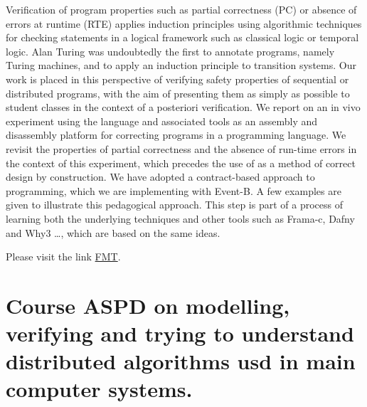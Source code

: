 \documentclass[ 12pt]{article}
\begin{document}
Verification of program properties such as partial correctness (PC) or absence of errors at runtime (RTE) applies induction principles using algorithmic techniques for checking statements in a logical framework such as classical logic or temporal logic.  Alan Turing was undoubtedly the first to annotate programs, namely Turing machines, and to apply an induction principle to transition systems.  Our work is placed in this perspective of verifying safety properties of sequential or distributed programs, with the aim of presenting them as simply as possible to student classes in the context of a posteriori verification.  We report on an in vivo experiment using the \eb language and associated tools as an assembly and disassembly platform for correcting programs in a programming language.  We revisit the properties of partial correctness and the absence of run-time errors in the context of this experiment, which precedes the use of \eb as a method of correct design by construction.  We have adopted a contract-based approach to programming, which we are implementing with Event-B.  A few examples are given to illustrate this pedagogical approach.  This step is part of a process of learning both the underlying techniques and other tools such as Frama-c, Dafny and Why3 \ldots, which are based on the same ideas.

Please visit the link \href{https://mery54.github.io/fmt}{FMT}.

\section{Course ASPD on modelling, verifying and trying to understand distributed algorithms usd in  main  computer systems. }
\end{document}
